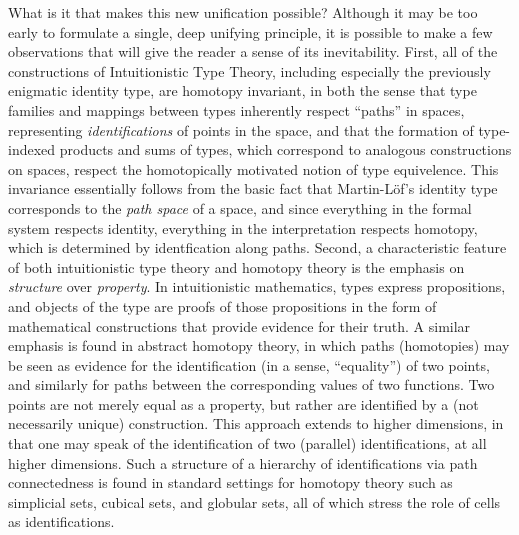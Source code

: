 \documentclass[11pt]{article}
\theoremstyle{remark}
\theoremstyle{definition}
\begin{document}
What is it that makes this new unification possible?  Although it may be too early to formulate a single, deep
unifying principle, it is possible to make a few observations that will give the reader a sense of its inevitability.
First, all of the constructions of Intuitionistic Type Theory, including especially the previously enigmatic identity
type, are homotopy invariant, in both the  sense that type families and mappings between types inherently respect
``paths'' in spaces, representing \emph{identifications} of points in the space, and that the formation of type-indexed
products and sums of types, which correspond to analogous constructions on spaces, respect the homotopically motivated
notion of type equivelence.  This invariance essentially follows from the basic fact that Martin-L\"{o}f's identity
type corresponds to the \emph{path space} of a space, and since everything in the formal system respects identity, 
everything in the interpretation respects homotopy, which is determined by identfication along paths.  Second, a characteristic feature of both intuitionistic type theory and homotopy theory is the emphasis on \emph{structure} over \emph{property}.  In intuitionistic
mathematics, types express propositions, and objects of the type are proofs of those propositions in the form of
mathematical constructions that provide evidence for their truth.  A similar emphasis is found in abstract homotopy
theory, in which paths (homotopies) may be seen as evidence for the identification (in a sense, ``equality'') of two
points, and similarly for paths between the corresponding values of two functions.  Two points are not merely equal as a
property, but rather are identified by a (not necessarily unique) construction.  This approach extends to higher
dimensions, in that one may speak of the identification of two (parallel) identifications, at all higher dimensions.
Such a structure of a hierarchy of identifications via path connectedness is found in standard settings for homotopy
theory such as simplicial sets, cubical sets, and globular sets, all of which stress the role of cells as
identifications.
\end{document}
